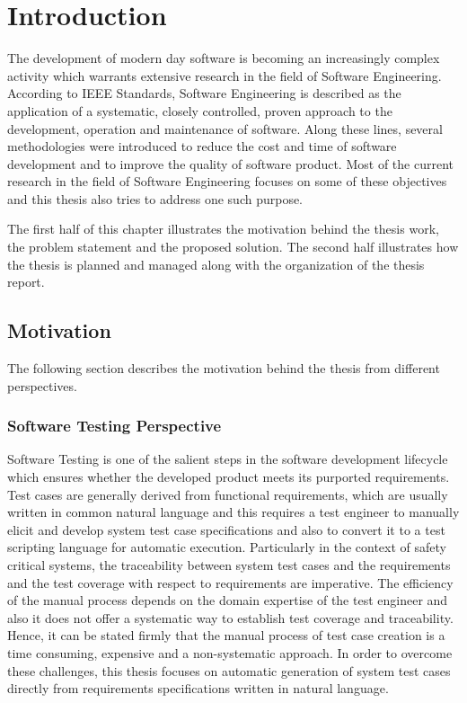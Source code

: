 
\chapter{Introduction}
The development of modern day software is becoming an increasingly complex activity which warrants extensive research in the field of Software Engineering. According to IEEE Standards, Software Engineering is described as the application of a systematic, closely controlled, proven approach to the development, operation and maintenance of software. Along these lines, several methodologies were introduced to reduce the cost and time of software development and to improve the quality of software product. Most of the current research in the field of Software Engineering focuses on some of these objectives and this thesis also tries to address one such purpose.

The first half of this chapter illustrates the motivation behind the thesis work, the problem statement and the proposed solution. The second half illustrates how the thesis is planned and managed along with the organization of the thesis report.
\section{Motivation}
The following section describes the motivation behind the thesis from different perspectives.
\subsection{Software Testing Perspective}
Software Testing is one of the salient steps in the software development lifecycle which ensures whether the developed product meets its purported requirements. Test cases are generally derived from functional requirements, which are usually written in common natural language and this requires a test engineer to manually elicit and develop system test case specifications and also to convert it to a test scripting language for automatic execution. Particularly in the context of safety critical systems, the traceability between system test cases and the requirements and the test coverage with respect to requirements are imperative. The efficiency of the manual process depends on the domain expertise of the test engineer and also it does not offer a systematic way to establish test coverage and traceability. Hence, it can be stated firmly that the manual process of test case creation is a time consuming, expensive and a non-systematic approach. In order to overcome these challenges, this thesis focuses on automatic generation of system test cases directly from requirements specifications written in natural language.
